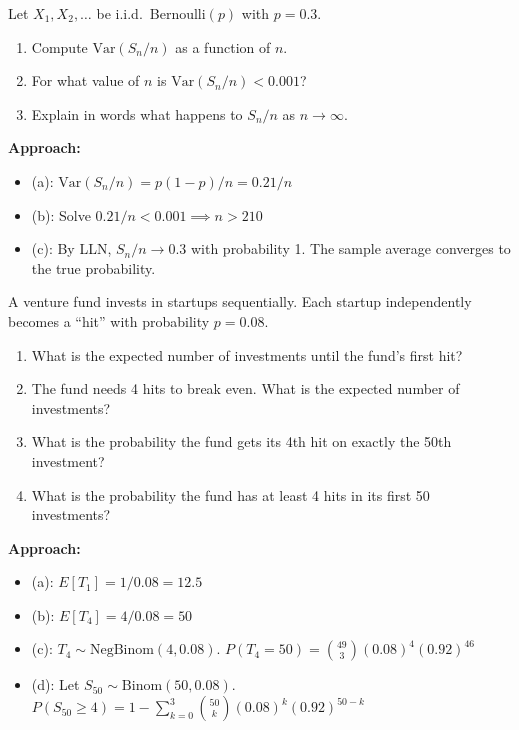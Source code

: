 \documentclass[11pt]{article}
\begin{document}
\begin{practicebox}
Let $X_1, X_2, \ldots$ be i.i.d.\ Bernoulli$(p)$ with $p = 0.3$.
\begin{enumerate}[label=(\alph*), nosep]
  \item Compute $\text{Var}(S_n/n)$ as a function of $n$.
  \item For what value of $n$ is $\text{Var}(S_n/n) < 0.001$?
  \item Explain in words what happens to $S_n/n$ as $n \to \infty$.
\end{enumerate}
\end{practicebox}

\textbf{Approach:}
\begin{itemize}[nosep]
  \item (a): $\text{Var}(S_n/n) = p(1-p)/n = 0.21/n$
  \item (b): Solve $0.21/n < 0.001 \implies n > 210$
  \item (c): By LLN, $S_n/n \to 0.3$ with probability 1. The sample average converges to the true probability.
\end{itemize}

\vspace{0.4cm}

\begin{practicebox}
A venture fund invests in startups sequentially. Each startup independently becomes a ``hit'' with probability $p = 0.08$.
\begin{enumerate}[label=(\alph*), nosep]
  \item What is the expected number of investments until the fund's first hit?
  \item The fund needs 4 hits to break even. What is the expected number of investments?
  \item What is the probability the fund gets its 4th hit on exactly the 50th investment?
  \item What is the probability the fund has at least 4 hits in its first 50 investments?
\end{enumerate}
\end{practicebox}

\textbf{Approach:}
\begin{itemize}[nosep]
  \item (a): $E[T_1] = 1/0.08 = 12.5$
  \item (b): $E[T_4] = 4/0.08 = 50$
  \item (c): $T_4 \sim \text{NegBinom}(4, 0.08)$. \; $P(T_4 = 50) = \binom{49}{3}(0.08)^4(0.92)^{46}$
  \item (d): Let $S_{50} \sim \text{Binom}(50, 0.08)$. \; $P(S_{50} \geq 4) = 1 - \sum_{k=0}^{3}\binom{50}{k}(0.08)^k(0.92)^{50-k}$
\end{itemize}
\end{document}
